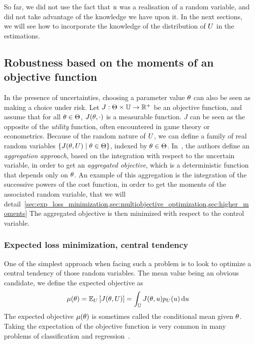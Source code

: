 \documentclass[../../Main_ManuscritThese.tex]{subfiles}
\begin{document}
So far, we did not use the fact that $u$ was a realisation of a
random variable, and did not take advantage of the knowledge we have
upon it. In the next sections, we will see how to incorporate the
knowledge of the distribution of $U$ in the estimations.

\subsection{Robustness based on the moments of an objective function}
In the presence of uncertainties, choosing a parameter value $\theta$ can
also be seen as making a choice under risk. Let
$J:\Theta \times \mathbb{U}\rightarrow \mathbb{R}^+$ be an objective
function, and assume that for all $\theta \in \Theta$, $J(\theta, \cdot)$
is a measurable function.  $J$ can be seen as the opposite of the
\emph{utility} function, often encountered in game theory or
econometrics.  Because of the random nature of $U$, we can define a
family of real random variables $\{J(\theta,U) \mid \theta \in \Theta\}$,
indexed by $\theta \in \Theta$.  In~\cite{beyer_robust_2007}, the
authors define an \emph{aggregation approach}, based on the
integration with respect to the uncertain variable, in order to get an
\emph{aggregated objective}, which is a deterministic function that
depends only on $\theta$.  An example of this aggregation is the
integration of the successive powers of the cost function, in order to
get the moments of the associated random variable, that we will
detail~\cref{sec:exp_loss_minimization,sec:multiobjective_optimization,sec:higher_moments} %
The aggregated objective is then minimized with respect to the control
variable.
\subsubsection{Expected loss minimization, central tendency}
\label{sec:exp_loss_minimization}
One of the simplest approach when facing such a problem is to look to
optimize a central tendency of those random variables. The mean value
being an obvious candidate, we define the expected objective as
\begin{equation}
  \label{eq:mean_objective}
  \mu(\theta) = \mathbb{E}_U\left[J(\theta,U)\right] =\int_{\mathbb{U}} J(\theta,u)p_U(u)\,\mathrm{d}u
\end{equation}
The expected objective $\mu(\theta)$ is sometimes called the conditional mean given $\theta$. Taking the expectation of the objective function is very common in many problems of classification and regression~\cite{bishop_pattern_2006}.
\end{document}
